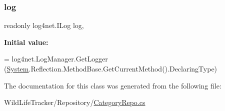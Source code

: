 \mbox{\label{classWildLifeTracker_1_1Repository_1_1CategoryRepo_ae6c6142b8525b2f4ac6ee6e003b3106f}} 
\subsubsection{\texorpdfstring{log}{log}}
{\footnotesize\ttfamily readonly log4net.\+I\+Log log\hspace{0.3cm}{\ttfamily [static]}, {\ttfamily [private]}}

{\bfseries Initial value\+:}
\begin{DoxyCode}
= log4net.LogManager.GetLogger
       (\hyperlink{namespaceSystem}{System}.Reflection.MethodBase.GetCurrentMethod().DeclaringType)
\end{DoxyCode}


The documentation for this class was generated from the following file\+:\begin{DoxyCompactItemize}
\item 
Wild\+Life\+Tracker/\+Repository/\hyperlink{CategoryRepo_8cs}{Category\+Repo.\+cs}\end{DoxyCompactItemize}
